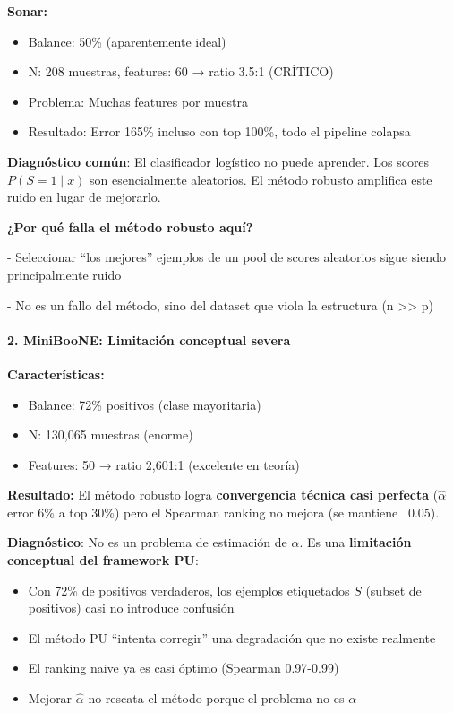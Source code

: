 \documentclass[a4paper,11pt]{article}
\begin{document}
\textbf{Sonar:}
\begin{itemize}
    \item Balance: 50\% (aparentemente ideal)
    \item N: 208 muestras, features: 60 → ratio 3.5:1 (CRÍTICO)
    \item Problema: Muchas features por muestra
    \item Resultado: Error 165\% incluso con top 100\%, todo el pipeline colapsa
\end{itemize}

\textbf{Diagnóstico común}: El clasificador logístico no puede aprender. Los scores $P(S=1 \mid x)$ son esencialmente aleatorios. El método robusto amplifica este ruido en lugar de mejorarlo.

\textbf{¿Por qué falla el método robusto aquí?}

- Seleccionar ``los mejores'' ejemplos de un pool de scores aleatorios sigue siendo principalmente ruido

- No es un fallo del método, sino del dataset que viola la estructura (n >> p)

\paragraph{2. MiniBooNE: Limitación conceptual severa}


\textbf{Características:}
\begin{itemize}
    \item Balance: 72\% positivos (clase mayoritaria)
    \item N: 130{,}065 muestras (enorme)
    \item Features: 50 → ratio 2{,}601:1 (excelente en teoría)
\end{itemize}

\textbf{Resultado:}
El método robusto logra \textbf{convergencia técnica casi perfecta} ($\hat{\alpha}$ error 6\% a top 30\%) pero el Spearman ranking no mejora (se mantiene ~0.05). 

\textbf{Diagnóstico}: No es un problema de estimación de $\alpha$. Es una \textbf{limitación conceptual del framework PU}:
\begin{itemize}
    \item Con 72\% de positivos verdaderos, los ejemplos etiquetados $S$ (subset de positivos) casi no introduce confusión
    \item El método PU ``intenta corregir'' una degradación que no existe realmente
    \item El ranking naive ya es casi óptimo (Spearman 0.97-0.99)
    \item Mejorar $\hat{\alpha}$ no rescata el método porque el problema no es $\alpha$
\end{itemize}
\end{document}
